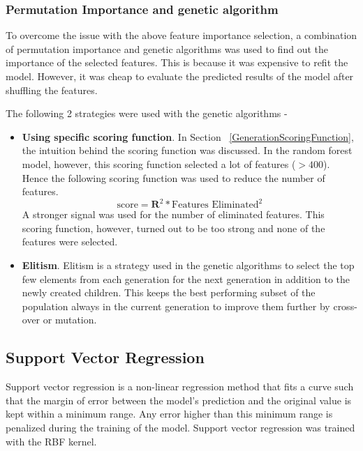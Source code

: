 \documentclass[11pt]{article}
\begin{document}
\subsubsection{Permutation Importance and genetic algorithm}
To overcome the issue with the above feature importance selection, a combination of permutation importance and genetic algorithms was used to find out the importance of the selected features.
This is because it was expensive to refit the model. However, it was cheap to evaluate the predicted results of the model after shuffling the features.

The following 2 strategies were used with the genetic algorithms -
\begin{itemize}
\item \textbf{Using specific scoring function}.  In Section ~\ref{GenerationScoringFunction},  the intuition behind the scoring function was discussed.
In the random forest model,  however,  this scoring function selected a lot of features ($> 400$). Hence the following scoring function was used to reduce the number of features. 
$$
\textrm{score} = \mathbf{R}^2 * \textrm{Features Eliminated}^2
$$
A stronger signal was used for the number of eliminated features. This scoring function, however,  turned out to be too strong and none of the features were selected.
\item \textbf{Elitism}.  Elitism is a strategy used in the genetic algorithms to select the top few elements from each generation for the next generation in addition to the newly created children. This keeps the best performing subset of the population always in the current generation to improve them further by cross-over or mutation.
\end{itemize}


\subsection{Support Vector Regression}
Support vector regression is a non-linear regression method that fits a curve such that the margin of error between the model's prediction and the original value is kept within a minimum range.
Any error higher than this minimum range is penalized during the training of the model.
Support vector regression was trained with the RBF kernel.
\end{document}
